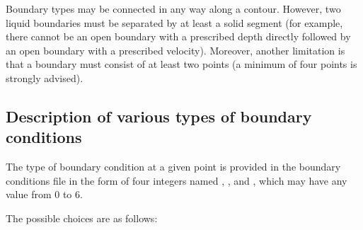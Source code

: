 Boundary types may be connected in any way along a contour.
However, two liquid boundaries must be separated by at least a solid segment
(for example, there cannot be an open boundary with a prescribed depth directly
followed by an open boundary with a prescribed velocity).
Moreover, another limitation is that a boundary must consist of at least two
points (a minimum of four points is strongly advised).


\subsection{Description of various types of boundary conditions}
\label{subs:desc:bc}
The type of boundary condition at a given point is provided in the
boundary conditions file in the form of four integers named
, ,  and ,
which may have any value from 0 to 6.

The possible choices are as follows:

